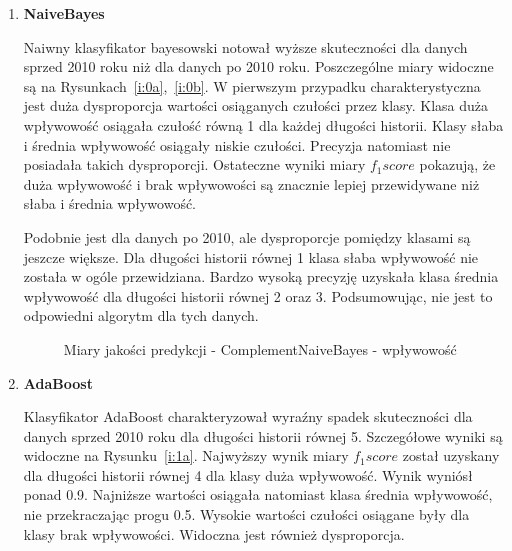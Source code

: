 \documentclass[polish,12pt]{aghthesis}
\begin{document}
\begin{enumerate}
    \item \textbf{NaiveBayes}
    
    Naiwny klasyfikator bayesowski notował wyższe skuteczności dla danych sprzed 2010 roku niż dla danych po 2010 roku. Poszczególne miary widoczne są na Rysunkach~\ref{i:0a},~\ref{i:0b}. W pierwszym przypadku charakterystyczna jest duża dysproporcja wartości osiąganych czułości przez klasy. Klasa duża wpływowość osiągała czułość równą 1 dla każdej długości historii. Klasy słaba i średnia wpływowość osiągały niskie czułości. Precyzja natomiast nie posiadała takich dysproporcji. Ostateczne wyniki miary \textit{$f_1 score$} pokazują, że duża wpływowość i brak wpływowości są znacznie lepiej przewidywane niż słaba i średnia wpływowość.
    
    Podobnie jest dla danych po 2010, ale dysproporcje pomiędzy klasami są jeszcze większe. Dla długości historii równej 1 klasa słaba wpływowość nie została w ogóle przewidziana. Bardzo wysoką precyzję uzyskała klasa średnia wpływowość dla długości historii równej 2 oraz 3. Podsumowując, nie jest to odpowiedni algorytm dla tych danych.
    
    
    \begin{figure}[ht] 
    \centering
    \hfill%
    \label{i:i1}
    \caption{Miary jakości predykcji - ComplementNaiveBayes - wpływowość}
    
\end{figure}

\FloatBarrier


    \item \textbf{AdaBoost}
    
    Klasyfikator AdaBoost charakteryzował wyraźny spadek skuteczności dla danych sprzed 2010 roku dla długości historii równej 5. Szczegółowe wyniki są widoczne na Rysunku~\ref{i:1a}. Najwyższy wynik miary \textit{$f_1 score$} został uzyskany dla długości historii równej 4 dla klasy duża wpływowość. Wynik wyniósł ponad 0.9. Najniższe wartości osiągała natomiast klasa średnia wpływowość, nie przekraczając progu 0.5. Wysokie wartości czułości osiągane były dla klasy brak wpływowości. Widoczna jest również dysproporcja.
    

\end{enumerate}
\end{document}
